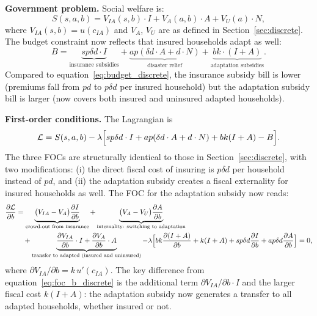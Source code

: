 \documentclass{article}
\begin{document}
\textbf{Government problem.} Social welfare is:
\begin{equation}
    S(s,a,b) = V_{IA}(s,b)\cdot I + V_A(a,b)\cdot A + V_U(a)\cdot N, \label{eq:welfare_premium_disc}
\end{equation}
where $V_{IA}(s,b) = u(c_{IA})$ and $V_A$, $V_U$ are as defined in Section~\ref{sec:discrete}. The budget constraint now reflects that insured households adapt as well:
\begin{equation}
    B = \underbrace{sp\delta d\cdot I}_{\text{insurance subsidies}}
    + \underbrace{ap(\delta d\cdot A + d\cdot N)}_{\text{disaster relief}}
    + \underbrace{bk\cdot (I + A)}_{\text{adaptation subsidies}}. \label{eq:budget_premium_disc}
\end{equation}
Compared to equation~\eqref{eq:budget_discrete}, the insurance subsidy bill is lower (premiums fall from $pd$ to $p\delta d$ per insured household) but the adaptation subsidy bill is larger (now covers both insured and uninsured adapted households).

\textbf{First-order conditions.} The Lagrangian is
\begin{equation}
    \mathcal{L} = S(s,a,b) - \lambda\Bigl[sp\delta d\cdot I + ap(\delta d\cdot A + d\cdot N) + bk(I+A) - B\Bigr].
\end{equation}
The three FOCs are structurally identical to those in Section~\ref{sec:discrete}, with two modifications: (i) the direct fiscal cost of insuring is $p\delta d$ per household instead of $pd$, and (ii) the adaptation subsidy creates a fiscal externality for insured households as well. The FOC for the adaptation subsidy now reads:
\begin{align}
    \frac{\partial\mathcal{L}}{\partial b}
    &= \underbrace{\bigl(V_{IA} - V_A\bigr)\frac{\partial I}{\partial b}}_{\text{crowd-out from insurance}}
    + \underbrace{\bigl(V_A - V_U\bigr)\frac{\partial A}{\partial b}}_{\text{internality: switching to adaptation}}
    \notag\\
    &\quad
    + \underbrace{\frac{\partial V_{IA}}{\partial b}\cdot I + \frac{\partial V_A}{\partial b}\cdot A}_{\text{transfer to adapted (insured and uninsured)}}
    - \lambda\Bigl[bk\frac{\partial (I+A)}{\partial b} + k(I+A) + sp\delta d\frac{\partial I}{\partial b} + ap\delta d\frac{\partial A}{\partial b}\Bigr]
    = 0, \label{eq:foc_b_premium_disc}
\end{align}
where $\partial V_{IA}/\partial b = k\,u'(c_{IA})$. The key difference from equation~\eqref{eq:foc_b_discrete} is the additional term $\partial V_{IA}/\partial b \cdot I$ and the larger fiscal cost $k(I+A)$: the adaptation subsidy now generates a transfer to all adapted households, whether insured or not.
\end{document}
